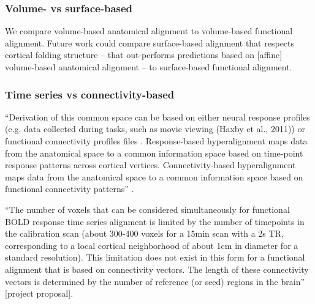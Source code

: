 \subsubsection{Volume- vs surface-based}



We compare volume-based anatomical alignment to volume-based functional
alignment.
%
Future work could compare surface-based alignment that respects cortical folding
structure -- that out-performs predictions based on [affine] volume-based
anatomical alignment \citep{weiner2018defining} -- to surface-based functional
alignment.


\subsubsection{Time series vs connectivity-based}



%
``Derivation of this common space can be based on either neural response
profiles (e.g. data collected during tasks, such as movie viewing (Haxby et al.,
2011)) or functional connectivity profiles files
\citep{guntupalli2018computational}.
%
Response-based hyperalignment maps data from the anatomical space to a common
information space based on time-point response patterns across cortical
vertices.
%
Connectivity-based hyperalignment maps data from the anatomical space to a
common information space based on functional connectivity patterns''
\citep{busch2021hybrid}.

%
``The number of voxels that can be considered simultaneously for functional BOLD
response time series alignment is limited by the number of timepoints in the
calibration scan (about 300-400 voxels for a 15min scan with a 2s TR,
corresponding to a local cortical neighborhood of about 1cm in diameter for a
standard resolution).
%
This limitation does not exist in this form for a functional alignment that is
based on connectivity vectors.
%
The length of these connectivity vectors is determined by the number of
reference (or seed) regions in the brain'' [project proposal].


